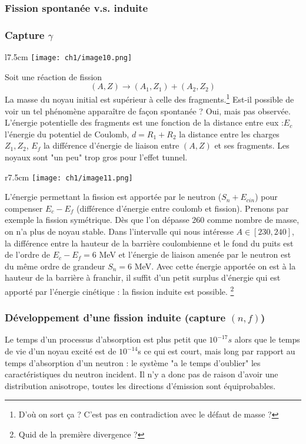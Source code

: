 \subsubsection{Fission spontanée v.s. induite}
\subsubsection{Capture $\gamma$}
	\begin{wrapfigure}[14]{l}{7.5cm}
	\texttt{[image: ch1/image10.png]}
	\end{wrapfigure}
Soit une réaction de fission
\begin{equation}
(A,Z) \to (A_1,Z_1)+(A_2,Z_2)
\end{equation}
La masse du noyau initial est supérieur à celle des fragments.\footnote{D'où on sort ça ? C'est pas en contradiction
avec le défaut de masse ?} Est-il possible de voir un tel 
phénomène apparaître de façon spontanée ? Oui, mais pas observée. L'énergie potentielle des 
fragments est une fonction de la distance entre eux :$E_c$ l'énergie du potentiel de Coulomb, $d
=R_1+R_2$ la distance entre les charges $Z_1,Z_2$, $E_f$ la différence d'énergie de liaison entre 
$(A,Z)$ et ses fragments. Les noyaux sont "un peu" trop gros pour l'effet tunnel. \\

	\begin{wrapfigure}[14]{r}{7.5cm}
	\vspace{-5mm}
	\texttt{[image: ch1/image11.png]}
	\end{wrapfigure}
L'énergie permettant la fission est apportée par le neutron ($S_n+E_{cin}$) pour compenser 
$E_c-E_f$ (différence d'énergie entre coulomb et fission). Prenons par exemple la fission 
symétrique. Dès que l'on dépasse 260 comme nombre de masse, on n'a plus de noyau stable. Dans 
l'intervalle qui nous intéresse $A\in[230,240]$, la différence entre la hauteur de la barrière 
coulombienne et le fond du puits est de l'ordre de $E_c-E_f=6$ MeV et l'énergie de liaison amenée par 
le neutron est du même ordre de grandeur $S_n = 6$ MeV. Avec cette énergie apportée on est à 
la hauteur de la barrière à franchir, il suffit d'un petit surplus d'énergie qui est apporté 
par l'énergie cinétique : la fission induite est possible.
\footnote{Quid de la première divergence ?}\\


\subsubsection{Développement d'une fission induite (capture $(n,f)$)}
Le temps d'un processus d'absorption est plus petit que $10^{-17}s$ alors que le temps de vie d'un 
noyau excité est de $10^{-14}$s ce qui est court, mais long par rapport au temps 
d'absorption d'un neutron : le système "a le temps d'oublier" les caractéristiques du neutron 
incident. Il n'y a donc pas de raison d'avoir une distribution anisotrope, toutes les directions 
d'émission sont équiprobables.\\

